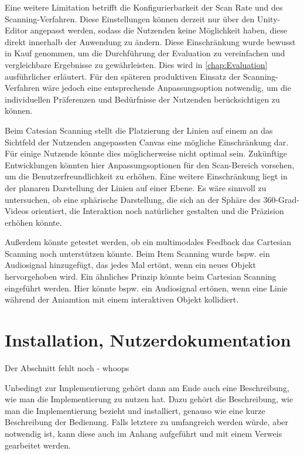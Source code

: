 Eine weitere Limitation betrifft die Konfigurierbarkeit der Scan Rate und des Scanning-Verfahren. Diese Einstellungen können derzeit nur über den Unity-Editor angepasst werden, sodass die Nutzenden keine Möglichkeit haben, diese direkt innerhalb der Anwendung zu ändern. Diese Einschränkung wurde bewusst in Kauf genommen, um die Durchführung der Evaluation zu vereinfachen und vergleichbare Ergebnisse zu gewährleisten. Dies wird in \autoref{chap:Evaluation} ausführlicher erläutert. 
Für den späteren produktiven Einsatz der Scanning-Verfahren wäre jedoch eine entsprechende Anpassungsoption notwendig, um die individuellen Präferenzen und Bedürfnisse der Nutzenden berücksichtigen zu können.

Beim Catesian Scanning stellt die Platzierung der Linien auf einem an das Sichtfeld der Nutzenden angepassten Canvas eine mögliche Einschränkung dar. Für einige Nutzende könnte dies möglicherweise nicht optimal sein. Zukünftige Entwicklungen könnten hier Anpassungsoptionen für den Scan-Bereich vorsehen, um die Benutzerfreundlichkeit zu erhöhen. Eine weitere Einschränkung liegt in der planaren Darstellung der Linien auf einer Ebene. Es wäre sinnvoll zu untersuchen, ob eine sphärische Darstellung, die sich an der Sphäre des 360-Grad-Videos orientiert, die Interaktion noch natürlicher gestalten und die Präzision erhöhen könnte.

Außerdem könnte getestet werden, ob ein multimodales Feedback das Cartesian Scanning noch unterstützen könnte. Beim Item Scanning wurde bspw. ein Audiosignal hinzugefügt, das jedes Mal ertönt, wenn ein neues Objekt hervorgehoben wird. Ein ähnliches Prinzip könnte beim Cartesian Scanning eingeführt werden. Hier könnte bspw. ein Audiosignal ertönen, wenn eine Linie während der Aniamtion mit einem interaktiven Objekt kollidiert. 

\section{Installation, Nutzerdokumentation}

Der Abschnitt fehlt noch - whoops 

Unbedingt zur Implementierung gehört dann am Ende auch eine Beschreibung, wie man die Implementierung zu nutzen hat. Dazu gehört die Beschreibung, wie man die Implementierung bezieht und installiert, genauso wie eine kurze Beschreibung der Bedienung. Falls letztere zu umfangreich werden würde, aber notwendig ist, kann diese auch im Anhang aufgeführt und mit einem Verweis gearbeitet werden.
